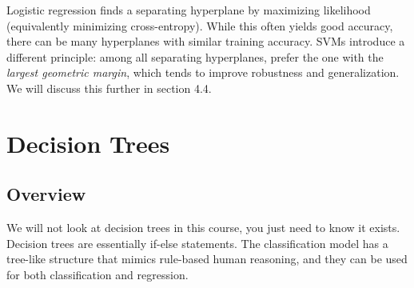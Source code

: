 \documentclass{article}
\begin{document}
Logistic regression finds a separating hyperplane by maximizing likelihood (equivalently minimizing cross-entropy). While this often yields good accuracy, there can be many hyperplanes with similar training accuracy. SVMs introduce a different principle: among all separating hyperplanes, prefer the one with the \textit{largest geometric margin}, which tends to improve robustness and generalization. We will discuss this further in section 4.4. 


\section{Decision Trees}
\subsection{Overview}
We will not look at decision trees in this course, you just need to know it exists. Decision trees are essentially if-else statements. The classification model has a tree-like structure that mimics rule-based human reasoning, and they can be used for both classification and regression.
\end{document}

